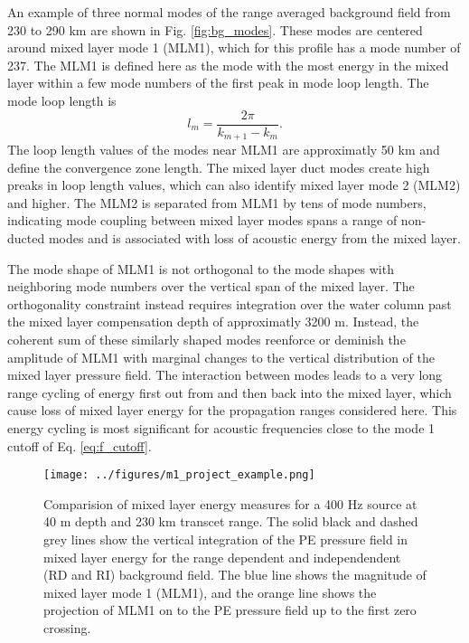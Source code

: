 \documentclass[preprint,NumberedRefs]{JASA}
\begin{document}
An example of three normal modes of the range averaged background field from 230 to 290 km are shown in Fig. \ref{fig:bg_modes}. These modes are centered around mixed layer mode 1 (MLM1), which for this profile has a mode number of 237. The MLM1 is defined here as the mode with the most energy in the mixed layer within a few mode numbers of the first peak in mode loop length\citep{jensen2011computational}. The mode loop length is
\begin{equation}
    l_{m} = \frac{2 \pi}{k_{m+1} - k_m}.
    \label{eq:loop_length}
\end{equation}
The loop length values of the modes near MLM1 are approximatly 50 km and define the convergence zone length. The mixed layer duct modes create high preaks in loop length values, which can also identify mixed layer mode 2 (MLM2) and higher. The MLM2 is separated from MLM1 by tens of mode numbers, indicating mode coupling between mixed layer modes spans a range of non-ducted modes and is associated with loss of acoustic energy from the mixed layer.

The mode shape of MLM1 is not orthogonal to the mode shapes with neighboring mode numbers over the vertical span of the mixed layer. The orthogonality constraint instead requires integration over the water column past the mixed layer compensation depth of approximatly 3200 m. Instead, the coherent sum of these similarly shaped modes reenforce or deminish the amplitude of MLM1 with marginal changes to the vertical distribution of the mixed layer pressure field. The interaction between modes leads to a very long range cycling of energy first out from and then back into the mixed layer, which cause loss of mixed layer energy for the propagation ranges considered here. This energy cycling is most significant for acoustic frequencies close to the mode 1 cutoff of Eq. \eqref{eq:f_cutoff}.

\begin{figure}
\texttt{[image: ../figures/m1\_project\_example.png]}
    \caption{\label{fig:energy_methods}{Comparision of mixed layer energy measures for a 400 Hz source at 40 m depth and 230 km transcet range. The solid black and dashed grey lines show the vertical integration of the PE pressure field in mixed layer energy for the range dependent and independendent (RD and RI) background field. The blue line shows the magnitude of mixed layer mode 1 (MLM1), and the orange line shows the projection of MLM1 on to the PE pressure field up to the first zero crossing.}}
\end{figure}
\end{document}
